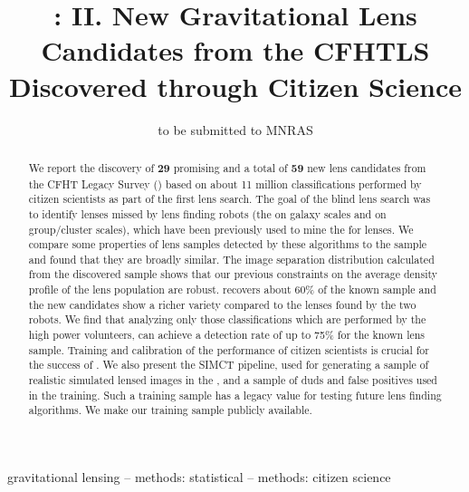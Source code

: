 \documentclass[useAMS,usenatbib,a4paper]{mn2e}
\title[New Gravitational Lens Candidates from CFHTLS]
{\SW: II. New Gravitational Lens Candidates from the CFHTLS Discovered
through Citizen Science}
\author[More et al.]{%
 
}
\begin{document}
\date{to be submitted to MNRAS}
\pagerange{\pageref{firstpage}--\pageref{lastpage}}

\maketitle

\label{firstpage}



\begin{abstract}

We report the discovery of {\bf 29} promising and a total of {\bf 59} new lens
candidates from the CFHT Legacy Survey (\cfhtls) based on about 11
million classifications performed by citizen scientists as part of the
first \sw lens search.  The goal of the blind lens search was to
identify lenses missed by lens finding robots (the \rf on galaxy scales
and \af on group/cluster scales), which have been previously used to
mine the \cfhtls for lenses.  We compare some properties of lens samples
detected by these algorithms to the \sw sample and found that they are
broadly similar.  The image separation distribution calculated from the
\sw discovered sample shows that our previous constraints on the average
density profile of the lens population are robust. \sw recovers about
60\% of the known sample and the new candidates show a richer variety
compared to the lenses found by the two robots. We find that analyzing
only those classifications which are performed by the high power
volunteers, \sw can achieve a detection rate of up to 75\% for the known
lens sample.  Training and calibration of the performance of citizen
scientists is crucial for the success of \sw. We also present the SIMCT
pipeline, used for generating a sample of realistic simulated lensed
images in the \cfhtls, and a sample of duds and false positives used in
the training.  Such a training sample has a legacy value for testing
future lens finding algorithms. We make our training sample publicly
available.

\end{abstract}


\begin{keywords}
  gravitational lensing   --
  methods: statistical    --
  methods: citizen science
\end{keywords}
\end{document}
